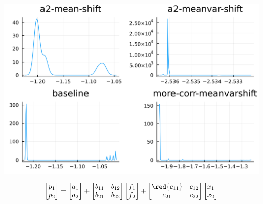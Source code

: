 \documentclass[
  ignorenonframetext,
]{beamer}
\begin{document}
\begin{frame}{}
\protect\hypertarget{section-9}{}
\begin{center}\includegraphics[width=0.95\paperheight]{complexity_files/figure-beamer/unnamed-chunk-31-1} \end{center}

\[
\begin{bmatrix}
 p_1 \\ p_2
\end{bmatrix} =
\begin{bmatrix}
 a_1 \\ {a_2}
\end{bmatrix}
 + 
 \begin{bmatrix}
 {b_{11}} & b_{12} \\
 {b_{21}} & {b_{22}}
\end{bmatrix}
\begin{bmatrix}
 f_1 \\ f_2
\end{bmatrix}
+
 \begin{bmatrix}
 \red{c_{11}} & c_{12} \\
 c_{21} & c_{22}
\end{bmatrix}
\begin{bmatrix}
 x_1 \\ x_2
\end{bmatrix}
\]
\end{frame}
\end{document}
